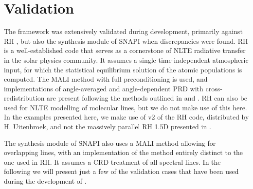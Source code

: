 \section{Validation}\label{Sec:LwValidation}

The \Lw{} framework was extensively validated during development, primarily against RH \citep{Uitenbroek2001}, but also the synthesis module of SNAPI \citep{Milic2018} when discrepancies were found.
RH is a well-established code that serves as a cornerstone of NLTE radiative transfer in the solar physics community.
It assumes a single time-independent atmospheric input, for which the statistical equilibrium solution of the atomic populations is computed.
The MALI method with full preconditioning \citep{Rybicki1992} is used, and implementations of angle-averaged and angle-dependent PRD with cross-redistribution are present following the methods outlined in \citet{Uitenbroek2001} and \citet{MillerRicci2002}.
RH can also be used for NLTE modelling of molecular lines, but we do not make use of this here.
In the examples presented here, we make use of v2 of the RH code, distributed by H. Uitenbroek, and not the massively parallel RH 1.5D presented in \citet{Pereira2015}.

The synthesis module of SNAPI also uses a MALI method allowing for overlapping lines, with an implementation of the method entirely distinct to the one used in RH.
It assumes a CRD treatment of all spectral lines.
In the following we will present just a few of the validation cases that have been used during the development of \Lw{}.


